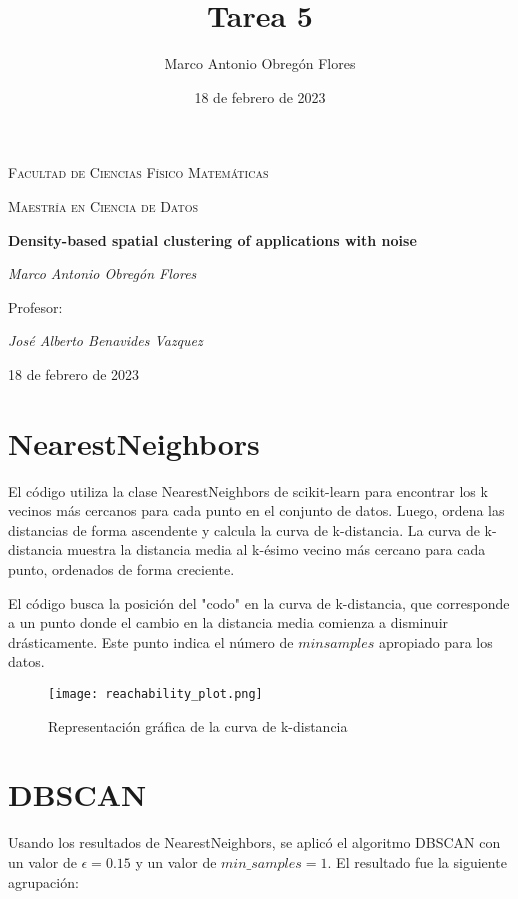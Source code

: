 \documentclass{article}
\title{Tarea 5}
\author{Marco Antonio Obregón Flores}
\date{18 de febrero de 2023}
\begin{document}
\begin{titlepage}
    \centering
    {\scshape\large Facultad de Ciencias Físico Matemáticas\par}
    {\scshape\large Maestría en Ciencia de Datos\par}
    \vspace{1cm}
    {\huge\bfseries Density-based spatial clustering of applications with noise\par}
    \vspace{2cm}
    {\Large\itshape Marco Antonio Obregón Flores\par}
    \vfill
    {\large Profesor:\par}
    {\Large\itshape José Alberto Benavides Vazquez\par}
    \vspace{1cm}
    {\large 18 de febrero de 2023\par}
\end{titlepage}

\section{NearestNeighbors}
\setlength{\parskip}{15pt}

El código utiliza la clase NearestNeighbors de scikit-learn para encontrar los k vecinos más cercanos para cada punto en el conjunto de datos. Luego, ordena las distancias de forma ascendente y calcula la curva de k-distancia. La curva de k-distancia muestra la distancia media al k-ésimo vecino más cercano para cada punto, ordenados de forma creciente.

El código busca la posición del "codo" en la curva de k-distancia, que corresponde a un punto donde el cambio en la distancia media comienza a disminuir drásticamente. Este punto indica el número de $min samples$
apropiado para los datos.

\begin{figure}[h]
\centering
\texttt{[image: reachability\_plot.png]}
\caption{Representación gráfica de la curva de k-distancia}
\label{fig:reachability_plot}
\end{figure}

\section{DBSCAN}

Usando los resultados de NearestNeighbors, se aplicó el algoritmo DBSCAN con un valor de $\epsilon = 0.15$ y un valor de $min\_samples = 1$. El resultado fue la siguiente agrupación:
\end{document}
